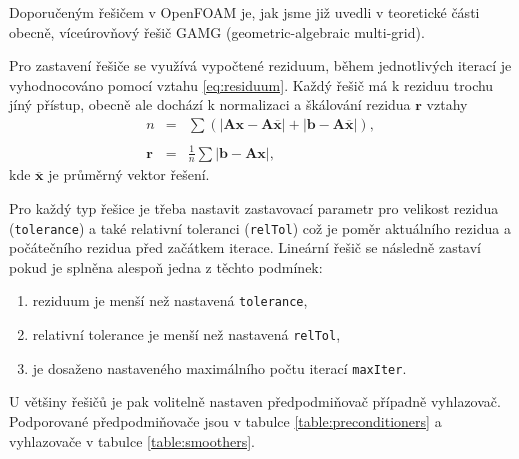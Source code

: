 \documentclass[a4paper,12pt]{report}
\theoremstyle{remark}
\begin{document}
	Doporučeným řešičem v OpenFOAM je, jak jsme již uvedli v teoretické části obecně,  víceúrovňový řešič GAMG (geometric-algebraic multi-grid).

	Pro zastavení řešiče se využívá vypočtené reziduum, během jednotlivých iterací je vyhodnocováno pomocí vztahu \eqref{eq:residuum}. Každý řešič má k reziduu trochu jíný přístup, obecně ale dochází k normalizaci a škálování rezidua $\boldsymbol{r}$ vztahy
\begin{eqnarray}
n &=& \sum \left( | \boldsymbol{A} \boldsymbol{x} - \boldsymbol{A} \overline{\boldsymbol{x}} | + | \boldsymbol{b} - \boldsymbol{A} \overline{\boldsymbol{x}} | \right), \nonumber \\
 \nonumber \\
\boldsymbol{r} &=& \frac{1}{n} \sum | \boldsymbol{b} - \boldsymbol{A} \boldsymbol{x} |,
\end{eqnarray}
kde $\overline{\boldsymbol{x}}$ je průměrný vektor řešení.  

Pro každý typ řešice je třeba nastavit zastavovací parametr pro velikost rezidua (\texttt{tolerance}) a také relativní toleranci (\texttt{relTol}) což je poměr aktuálního rezidua a počátečního rezidua před začátkem iterace. Lineární řešič se následně zastaví pokud je splněna alespoň jedna z těchto podmínek:
\begin{enumerate}
	\item reziduum je menší než nastavená \texttt{tolerance},
	\item relativní tolerance je menší než nastavená \texttt{relTol},
	\item je dosaženo nastaveného maximálního počtu iterací \texttt{maxIter}.
\end{enumerate}




U většiny řešičů je pak volitelně nastaven předpodmiňovač případně vyhlazovač. Podporované předpodmiňovače jsou v tabulce \ref{table:preconditioners} a vyhlazovače v tabulce \ref{table:smoothers}.
\end{document}
